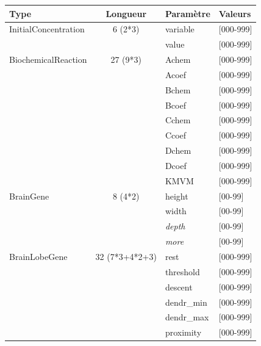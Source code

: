 \documentclass[11pt,twoside,a4paper]{article}
\begin{document}

\begin{table}[ht]
	\begin{center} \begin{scriptsize}
	\begin{tabular}{|p{}|c|p{}|p{}|}
\hline
	\rowcolor{lightgray} Type	& Longueur	& Param{\`e}tre	& Valeurs \\ \hline
	InitialConcentration		&	6 (2*3)		&	variable	& [000-999] \\
	\cline{3-4} %
								&				&	value		& [000-999] \\
	\hline \hline
	BiochemicalReaction			&	27 (9*3)	&	Achem		& [000-999] \\
	\cline{3-4} %
								&				&	Acoef		& [000-999] \\
	\cline{3-4} %
								&				&	Bchem		& [000-999] \\
	\cline{3-4} %
								&				&	Bcoef		& [000-999] \\
	\cline{3-4} %
								&				&	Cchem		& [000-999] \\
	\cline{3-4} %
								&				&	Ccoef		& [000-999] \\
	\cline{3-4} %
								&				&	Dchem		& [000-999] \\
	\cline{3-4} %
								&				&	Dcoef		& [000-999] \\
	\cline{3-4} %
								&				&	KMVM		& [000-999] \\
	\hline \hline
	BrainGene					&	8 (4*2)		&	height		& [00-99] \\
	\cline{3-4} %
								&				&	width		& [00-99] \\
	\cline{3-4} %
								&				&	\textit{depth}	& [00-99] \\
	\cline{3-4} %
								&				&	\textit{more}	& [00-99] \\
	\hline \hline
	BrainLobeGene				& 32 (7*3+4*2+3)&	rest		& [000-999] \\
	\cline{3-4} %
								&				&	threshold	& [000-999] \\
	\cline{3-4} %
								&				&	descent		& [000-999] \\
	\cline{3-4} %
								&				&	dendr\_min	& [000-999] \\
	\cline{3-4} %
								&				&	dendr\_max	& [000-999] \\
	\cline{3-4} %
								&				&	proximity	& [000-999] \\

\end{tabular}
\end{scriptsize}
\end{center}
\end{table}
\end{document}
